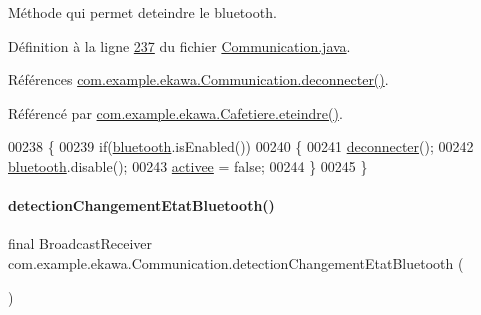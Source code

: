 Méthode qui permet d\textquotesingle{}eteindre le bluetooth. 



Définition à la ligne \hyperlink{_communication_8java_source_l00237}{237} du fichier \hyperlink{_communication_8java_source}{Communication.\+java}.



Références \hyperlink{_communication_8java_source_l00250}{com.\+example.\+ekawa.\+Communication.\+deconnecter()}.



Référencé par \hyperlink{_cafetiere_8java_source_l00424}{com.\+example.\+ekawa.\+Cafetiere.\+eteindre()}.


\begin{DoxyCode}
00238     \{
00239         \textcolor{keywordflow}{if}(\hyperlink{classcom_1_1example_1_1ekawa_1_1_communication_a0ed43f74b2eae7e8f150b049953da384}{bluetooth}.isEnabled())
00240         \{
00241             \hyperlink{classcom_1_1example_1_1ekawa_1_1_communication_a024ca42abcc8727d303a54ec44b4c99b}{deconnecter}();
00242             \hyperlink{classcom_1_1example_1_1ekawa_1_1_communication_a0ed43f74b2eae7e8f150b049953da384}{bluetooth}.disable();
00243             \hyperlink{classcom_1_1example_1_1ekawa_1_1_communication_a2f49177a9865ed41a759bce83658bb6e}{activee} = \textcolor{keyword}{false};
00244         \}
00245     \}
\end{DoxyCode}
\mbox{\label{classcom_1_1example_1_1ekawa_1_1_communication_a7fb7acee2a343c884103481715ab4e65}} 
\paragraph{\texorpdfstring{detection\+Changement\+Etat\+Bluetooth()}{detectionChangementEtatBluetooth()}}
{\footnotesize\ttfamily final Broadcast\+Receiver com.\+example.\+ekawa.\+Communication.\+detection\+Changement\+Etat\+Bluetooth (\begin{DoxyParamCaption}{ }\end{DoxyParamCaption})\hspace{0.3cm}{\ttfamily [private]}}



